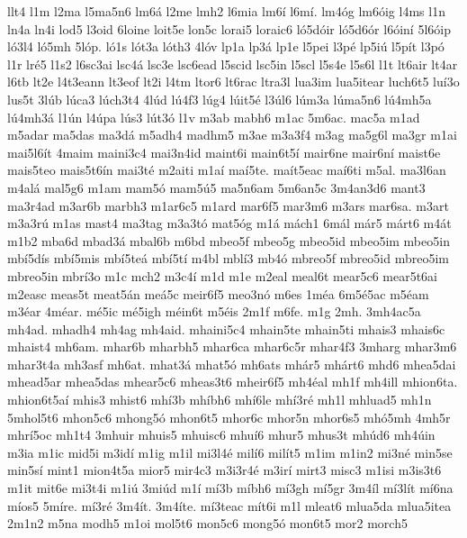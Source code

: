 {llt4
l1m
l2ma
l5ma5n6
lm6^^e1
l2me
lmh2
l6mia
lm6^^ed
l6m^^ed.
lm4^^f3g
lm6^^f3ig
l4ms
l1n
ln4a
ln4i
lod5
l3oid
6loine
loit5e
lon5c
lorai5
loraic6
l^^f35d^^f3ir
l^^f35d6^^f3r
l6^^f3in^^ed
5l6^^f3ip
l^^f33l4
l^^f35mh
5l^^f3p.
l^^f31s
l^^f3t3a
l^^f3th3
4l^^f3v
lp1a
lp3^^e1
lp1e
l5pei
l3p^^e9
lp5i^^fa
l5p^^edt
l3p^^f3
l1r
lr^^e95
l1s2
l6sc3ai
lsc4^^e1
lsc3e
lsc6ead
l5scid
lsc5in
l5scl
l5s4e
l5s6l
l1t
lt6air
lt4ar
l6tb
lt2e
l4t3eann
lt3eof
lt2i
l4tm
ltor6
lt6rac
ltra3l
lua3im
lua5itear
luch6t5
lu^^ed3o
lus5t
3l^^fab
l^^faca3
l^^fach3t4
4l^^fad
l^^fa4f3
l^^fag4
l^^fait5^^e9
l3^^fal6
l^^fam3a
l^^fama5n6
l^^fa4mh5a
l^^fa4mh3^^e1
l1^^fan
l4^^fapa
l^^fas3
l^^fat3^^f3
l1v
m3ab
mabh6
m1ac
5m6ac.
mac5a
m1ad
m5adar
ma5das
ma3d^^e1
m5adh4
madhm5
m3ae
m3a3f4
m3ag
ma5g6l
ma3gr
m1ai
mai5l6^^edt
4maim
maini3c4
mai3n4id
maint6i
main6t5^^ed
mair6ne
mair6n^^ed
maist6e
mais5teo
mais5t6^^edn
mai3t^^e9
m2aiti
m1a^^ed
ma^^ed5te.
ma^^edt5eac
ma^^ed6ti
m5al.
ma3l6an
m4al^^e1
mal5g6
m1am
mam5^^f3
mam5^^fa5
ma5n6am
5m6an5c
3m4an3d6
mant3
ma3r4ad
m3ar6b
marbh3
m1ar6c5
m1ard
mar6f5
mar3m6
m3ars
mar6sa.
m3art
m3a3r^^fa
m1as
mast4
ma3tag
m3a3t^^f3
mat5^^f3g
m1^^e1
m^^e1ch1
6m^^e1l
m^^e1r5
m^^e1rt6
m4^^e1t
m1b2
mba6d
mbad3^^e1
mbal6b
m6bd
mbeo5f
mbeo5g
mbeo5id
mbeo5im
mbeo5in
mb^^ed5d^^eds
mb^^ed5mis
mb^^ed5te^^e1
mb^^ed5t^^ed
m4bl
mbl^^ed3
mb4^^f3
mbreo5f
mbreo5id
mbreo5im
mbreo5in
mbr^^ed3o
m1c
mch2
m3c4^^ed
m1d
m1e
m2eal
meal6t
mear5c6
mear5t6ai
m2easc
meas5t
meat5^^e1n
me^^e15c
meir6f5
meo3n^^f3
m6es
1m^^e9a
6m5^^e95ac
m5^^e9am
m3^^e9ar
4m^^e9ar.
m^^e95ic
m^^e95igh
m^^e9in6t
m5^^e9is
2m1f
m6fe.
m1g
2mh.
3mh4ac5a
mh4ad.
mhadh4
mh4ag
mh4aid.
mhaini5c4
mhain5te
mhain5ti
mhais3
mhais6c
mhaist4
mh6am.
mhar6b
mharbh5
mhar6ca
mhar6c5r
mhar4f3
3mharg
mhar3m6
mhar3t4a
mh3asf
mh6at.
mhat3^^e1
mhat5^^f3
mh6ats
mh^^e1r5
mh^^e1rt6
mhd6
mhea5dai
mhead5ar
mhea5das
mhear5c6
mheas3t6
mheir6f5
mh4^^e9al
mh1f
mh4ill
mhion6ta.
mhion6t5a^^ed
mhis3
mhist6
mh^^ed3b
mh^^edbh6
mh^^ed6le
mh^^ed3r^^e9
mh1l
mhluad5
mh1n
5mhol5t6
mhon5c6
mhong5^^f3
mhon6t5
mhor6c
mhor5n
mhor6s5
mh^^f35mh
4mh5r
mhr^^ed5oc
mh1t4
3mhuir
mhuis5
mhuisc6
mhu^^ed6
mhur5
mhus3t
mh^^fad6
mh4^^fain
m3ia
m1ic
mid5i
m3id^^ed
m1ig
m1il
mi3l4^^e9
mil^^ed6
mil^^edt5
m1im
m1in2
mi3n^^e9
min5se
min5s^^ed
mint1
mion4t5a
mior5
mir4c3
m3i3r4^^e9
m3ir^^ed
mirt3
misc3
m1isi
m3is3t6
m1it
mit6e
mi3t4i
m1i^^fa
3mi^^fad
m1^^ed
m^^ed3b
m^^edbh6
m^^ed3gh
m^^ed5gr
3m4^^edl
m^^ed3l^^edt
m^^ed6na
m^^edos5
5m^^edre.
m^^ed3r^^e9
3m4^^edt.
3m4^^edte.
m^^ed3teac
m^^edt6i
m1l
mleat6
mlua5da
mlua5itea
2m1n2
m5na
modh5
m1oi
mol5t6
mon5c6
mong5^^f3
mon6t5
mor2
morch5
}
